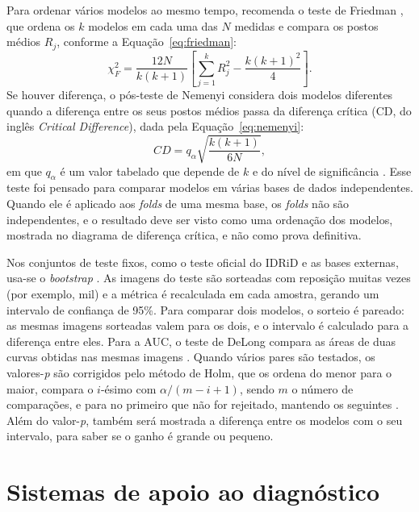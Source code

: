 Para ordenar vários modelos ao mesmo tempo,  recomenda o teste de Friedman \cite{friedman1937ranks}, que ordena os $k$ modelos em cada uma das $N$ medidas e compara os postos médios $R_j$, conforme a Equação~\ref{eq:friedman}:
\begin{equation}
	\label{eq:friedman}
	\chi^2_F = \frac{12N}{k(k+1)} \left[ \sum_{j=1}^{k} R_j^2 - \frac{k(k+1)^2}{4} \right].
\end{equation}
Se houver diferença, o pós-teste de Nemenyi considera dois modelos diferentes quando a diferença entre os seus postos médios passa da diferença crítica (CD, do inglês \textit{Critical Difference}), dada pela Equação~\ref{eq:nemenyi}:
\begin{equation}
	\label{eq:nemenyi}
	CD = q_{\alpha} \sqrt{\frac{k(k+1)}{6N}},
\end{equation}
em que $q_{\alpha}$ é um valor tabelado que depende de $k$ e do nível de significância \cite{demsar2006statistical}. Esse teste foi pensado para comparar modelos em várias bases de dados independentes. Quando ele é aplicado aos \textit{folds} de uma mesma base, os \textit{folds} não são independentes, e o resultado deve ser visto como uma ordenação dos modelos, mostrada no diagrama de diferença crítica, e não como prova definitiva.

Nos conjuntos de teste fixos, como o teste oficial do IDRiD e as bases externas, usa-se o \textit{bootstrap} \cite{efron1979bootstrap}. As imagens do teste são sorteadas com reposição muitas vezes (por exemplo, mil) e a métrica é recalculada em cada amostra, gerando um intervalo de confiança de 95\%. Para comparar dois modelos, o sorteio é pareado: as mesmas imagens sorteadas valem para os dois, e o intervalo é calculado para a diferença entre eles. Para a AUC, o teste de DeLong compara as áreas de duas curvas obtidas nas mesmas imagens \cite{delong1988}. Quando vários pares são testados, os valores-\textit{p} são corrigidos pelo método de Holm, que os ordena do menor para o maior, compara o $i$-ésimo com $\alpha/(m - i + 1)$, sendo $m$ o número de comparações, e para no primeiro que não for rejeitado, mantendo os seguintes \cite{holm1979simple}. Além do valor-\textit{p}, também será mostrada a diferença entre os modelos com o seu intervalo, para saber se o ganho é grande ou pequeno.

\section{Sistemas de apoio ao diagnóstico}
\label{sec:cad}


